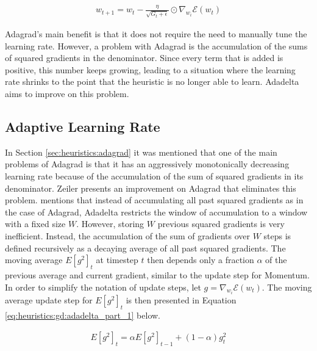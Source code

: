 \begin{equation}
    \label{eq:heuristics:gd:adagrad_part_2}
    \begin{split}
        w_{t+1} = w_{t} - \frac{\eta}{\sqrt{G_{t} + \epsilon}} \odot \nabla_{w_{i}}\mathcal{E}(w_{t})
    \end{split}
\end{equation}

\Ac{Adagrad}'s main benefit is that it does not require the need to manually tune the learning rate. However, a problem with \ac{Adagrad} is the accumulation of the sums of squared gradients in the denominator. Since every term that is added is positive, this number keeps growing, leading to a situation where the learning rate shrinks to the point that the heuristic is no longer able to learn. \acl{Adadelta} aims to improve on this problem.

\subsection{Adaptive Learning Rate}
\label{sec:heuristics:adadelta}

In Section \ref{sec:heuristics:adagrad} it was mentioned that one of the main problems of \ac{Adagrad} is that it has an aggressively monotonically decreasing learning rate because of the accumulation of the sum of squared gradients in its denominator. Zeiler \cite{ref:zeiler:2012} presents an improvement on \ac{Adagrad} that eliminates this problem. \citeauthor{ref:ruder:2016} \cite{ref:ruder:2016} mentions that instead of accumulating all past squared gradients as in the case of \ac{Adagrad}, \ac{Adadelta} restricts the window of accumulation to a window with a fixed size $W$. However, storing $W$ previous squared gradients is very inefficient. Instead, the accumulation of the sum of gradients over $W$ steps is defined recursively as a decaying average of all past squared gradients. The moving average $E[g^{2}]_{t}$ at timestep $t$ then depends only a fraction $\alpha$ of the previous average and current gradient, similar to the update step for \ac{Momentum}. In order to simplify the notation of update steps, let $g = \nabla_{w_{i}}\mathcal{E}(w_{t})$. The moving average update step for $E[g^{2}]_{t}$ is then presented in Equation \ref{eq:heuristics:gd:adadelta_part_1} below.

\begin{equation}
    \label{eq:heuristics:gd:adadelta_part_1}
    \begin{split}
        E[g^{2}]_{t} = \alpha E[g^{2}]_{t - 1} + (1 - \alpha)g_{t}^{2}
    \end{split}
\end{equation}

